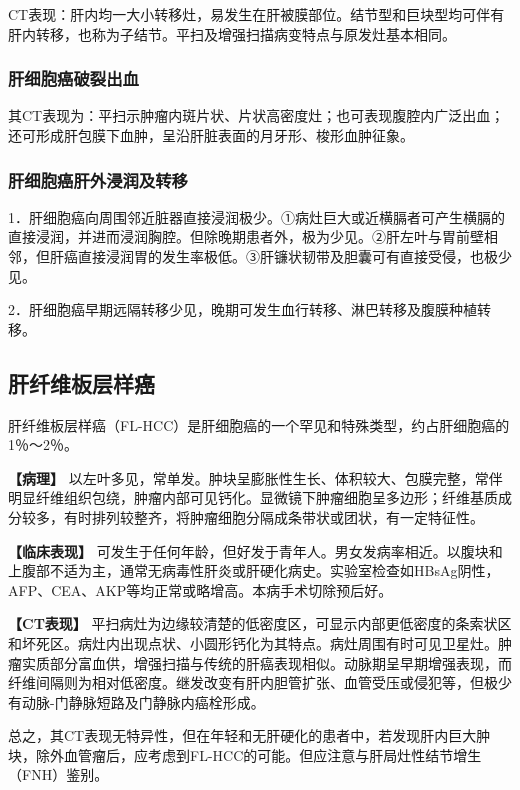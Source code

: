 CT表现：肝内均一大小转移灶，易发生在肝被膜部位。结节型和巨块型均可伴有肝内转移，也称为子结节。平扫及增强扫描病变特点与原发灶基本相同。

\subsubsection{肝细胞癌破裂出血}

其CT表现为：平扫示肿瘤内斑片状、片状高密度灶；也可表现腹腔内广泛出血；还可形成肝包膜下血肿，呈沿肝脏表面的月牙形、梭形血肿征象。

\subsubsection{肝细胞癌肝外浸润及转移}

1．肝细胞癌向周围邻近脏器直接浸润极少。①病灶巨大或近横膈者可产生横膈的直接浸润，并进而浸润胸腔。但除晚期患者外，极为少见。②肝左叶与胃前壁相邻，但肝癌直接浸润胃的发生率极低。③肝镰状韧带及胆囊可有直接受侵，也极少见。

2．肝细胞癌早期远隔转移少见，晚期可发生血行转移、淋巴转移及腹膜种植转移。

\subsection{肝纤维板层样癌}

肝纤维板层样癌（FL-HCC）是肝细胞癌的一个罕见和特殊类型，约占肝细胞癌的1％～2％。

\textbf{【病理】}
以左叶多见，常单发。肿块呈膨胀性生长、体积较大、包膜完整，常伴明显纤维组织包绕，肿瘤内部可见钙化。显微镜下肿瘤细胞呈多边形；纤维基质成分较多，有时排列较整齐，将肿瘤细胞分隔成条带状或团状，有一定特征性。

\textbf{【临床表现】}
可发生于任何年龄，但好发于青年人。男女发病率相近。以腹块和上腹部不适为主，通常无病毒性肝炎或肝硬化病史。实验室检查如HBsAg阴性，AFP、CEA、AKP等均正常或略增高。本病手术切除预后好。

\textbf{【CT表现】}
平扫病灶为边缘较清楚的低密度区，可显示内部更低密度的条索状区和坏死区。病灶内出现点状、小圆形钙化为其特点。病灶周围有时可见卫星灶。肿瘤实质部分富血供，增强扫描与传统的肝癌表现相似。动脉期呈早期增强表现，而纤维间隔则为相对低密度。继发改变有肝内胆管扩张、血管受压或侵犯等，但极少有动脉-门静脉短路及门静脉内癌栓形成。

总之，其CT表现无特异性，但在年轻和无肝硬化的患者中，若发现肝内巨大肿块，除外血管瘤后，应考虑到FL-HCC的可能。但应注意与肝局灶性结节增生（FNH）鉴别。

